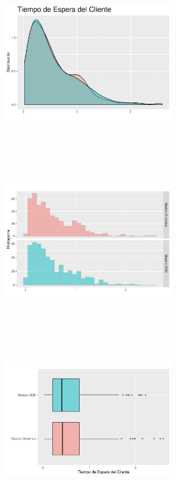 \documentclass[]{article}
\begin{document}
\begin{center}\includegraphics[width=280px,height=280px]{sistema_dinamico_files/figure-latex/unnamed-chunk-14-1} \end{center}

\begin{center}\includegraphics[width=280px,height=280px]{sistema_dinamico_files/figure-latex/unnamed-chunk-15-1} \end{center}

\begin{center}\includegraphics[width=280px,height=280px]{sistema_dinamico_files/figure-latex/unnamed-chunk-16-1} \end{center}
\end{document}
